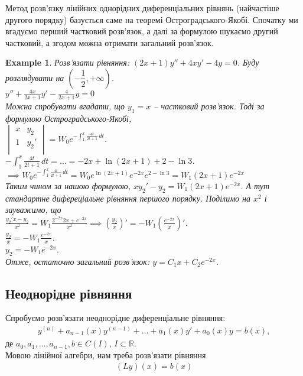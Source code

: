 \documentclass[a4paper, 10pt]{article}
\theoremstyle{theoremdd}
\theoremstyle{theoremdd}
\theoremstyle{theoremdd}
\theoremstyle{theoremdd}
\newtheorem{example}[theorem]{Example}
\theoremstyle{theoremdd}
\theoremstyle{theoremdd}
\theoremstyle{theoremdd}
\theoremstyle{theoremdd}
\begin{document}
Метод розв'язку лінійних однорідних диференціальних рівнянь (найчастіше другого порядку) базується саме на теоремі Остроградського-Якобі. Спочатку ми вгадуємо перший частковий розв'язок, а далі за формулою шукаємо другий частковий, а згодом можна отримати загальний розв'язок.

\begin{example}
Розв'язати рівняння: $(2x+1)y'' + 4xy' - 4y = 0$. Буду розглядувати на $\left(-\dfrac{1}{2},+\infty\right)$.\\
$\displaystyle y'' + \frac{4x}{2x+1}y' - \frac{4}{2x+1}y = 0$\\
Можна спробувати вгадати, що $y_1 = x$ -- частковий розв'язок. Тоді за формулою Остроградського-Якобі,\\
$\displaystyle \begin{vmatrix}
x & y_2 \\
1 & y_2' \\
\end{vmatrix}
= W_0 e^{\displaystyle-\int_{1}^x \frac{4t}{2t+1}\,dt}$.\\
$\displaystyle -\int_{1}^x \frac{4t}{2t+1}\,dt = \dots = -2x + \ln(2x+1) + 2 - \ln3$.\\
$\implies W_0 e^{-\displaystyle\int_{1}^x \frac{4t}{2t+1}\,dt} = W_0 e^{\ln(2x+1)} e^{-2x} e^{2 - \ln3} = W_1(2x+1)e^{-2x}$\\
Таким чином за нашою формулою, $xy_2'-y_2=W_1(2x+1)e^{-2x}$. А тут стандартне дифереціальне рівняння першого порядку. Поділимо на $x^2$ і зауважимо, що\\
$\displaystyle \frac{y_2'x-y_2}{x^2} = W_1 \frac{2^{-2x}2x + e^{-2x}}{x^2} \implies \left(\frac{y_2}{x}\right)' = -W_1 \left( \frac{e^{-2x}}{x} \right)'$.\\
$\displaystyle \frac{y_2}{x} = -W_1 \frac{e^{-2x}}{x}$.\\
$y_2 = -W_1e^{-2x}$.\\
Отже, остаточно загальний розв'язок: $y = C_1x + C_2e^{-2x}$.
\end{example}

\subsection{Неоднорідне рівняння}
Спробуємо розв'язати неоднорідне диференціальне рівняння:
\begin{align*}
y^{(n)} + a_{n-1}(x)y^{(n-1)}+\dots+a_1(x)y'+a_0(x)y = b(x),
\end{align*}
де $a_0, a_1,\dots,a_{n-1}, b\in C(I)$, $I \subset \mathbb{R}$.\\
Мовою лінійної алгебри, нам треба розв'язати рівняння
\begin{align*}
(Ly)(x) = b(x)
\end{align*}
\end{document}
